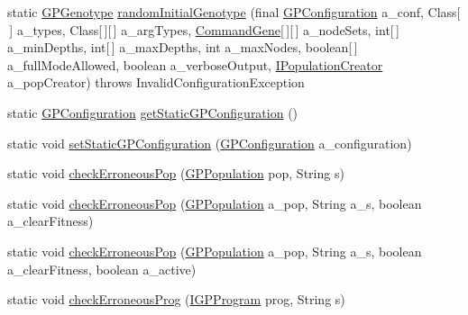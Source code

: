 \begin{DoxyCompactItemize}
static \hyperlink{classorg_1_1jgap_1_1gp_1_1impl_1_1_g_p_genotype}{G\-P\-Genotype} \hyperlink{classorg_1_1jgap_1_1gp_1_1impl_1_1_g_p_genotype_af3246cb6a802ae1cde833013c130f6e9}{random\-Initial\-Genotype} (final \hyperlink{classorg_1_1jgap_1_1gp_1_1impl_1_1_g_p_configuration}{G\-P\-Configuration} a\-\_\-conf, Class\mbox{[}$\,$\mbox{]} a\-\_\-types, Class\mbox{[}$\,$\mbox{]}\mbox{[}$\,$\mbox{]} a\-\_\-arg\-Types, \hyperlink{classorg_1_1jgap_1_1gp_1_1_command_gene}{Command\-Gene}\mbox{[}$\,$\mbox{]}\mbox{[}$\,$\mbox{]} a\-\_\-node\-Sets, int\mbox{[}$\,$\mbox{]} a\-\_\-min\-Depths, int\mbox{[}$\,$\mbox{]} a\-\_\-max\-Depths, int a\-\_\-max\-Nodes, boolean\mbox{[}$\,$\mbox{]} a\-\_\-full\-Mode\-Allowed, boolean a\-\_\-verbose\-Output, \hyperlink{interfaceorg_1_1jgap_1_1gp_1_1_i_population_creator}{I\-Population\-Creator} a\-\_\-pop\-Creator)  throws Invalid\-Configuration\-Exception 
\item 
static \hyperlink{classorg_1_1jgap_1_1gp_1_1impl_1_1_g_p_configuration}{G\-P\-Configuration} \hyperlink{classorg_1_1jgap_1_1gp_1_1impl_1_1_g_p_genotype_a07e4b22e1cd10bbc198278efd83d27ce}{get\-Static\-G\-P\-Configuration} ()
\item 
static void \hyperlink{classorg_1_1jgap_1_1gp_1_1impl_1_1_g_p_genotype_a7750ff9b7bd73efcfff522365f4650d7}{set\-Static\-G\-P\-Configuration} (\hyperlink{classorg_1_1jgap_1_1gp_1_1impl_1_1_g_p_configuration}{G\-P\-Configuration} a\-\_\-configuration)
\item 
static void \hyperlink{classorg_1_1jgap_1_1gp_1_1impl_1_1_g_p_genotype_a71cc6d10d81d132ee542767aca12f502}{check\-Erroneous\-Pop} (\hyperlink{classorg_1_1jgap_1_1gp_1_1impl_1_1_g_p_population}{G\-P\-Population} pop, String s)
\item 
static void \hyperlink{classorg_1_1jgap_1_1gp_1_1impl_1_1_g_p_genotype_af886a583789e547400134f2ad533cf8b}{check\-Erroneous\-Pop} (\hyperlink{classorg_1_1jgap_1_1gp_1_1impl_1_1_g_p_population}{G\-P\-Population} a\-\_\-pop, String a\-\_\-s, boolean a\-\_\-clear\-Fitness)
\item 
static void \hyperlink{classorg_1_1jgap_1_1gp_1_1impl_1_1_g_p_genotype_a6cab9ecf163e4eec850da3cc63df8665}{check\-Erroneous\-Pop} (\hyperlink{classorg_1_1jgap_1_1gp_1_1impl_1_1_g_p_population}{G\-P\-Population} a\-\_\-pop, String a\-\_\-s, boolean a\-\_\-clear\-Fitness, boolean a\-\_\-active)
\item 
static void \hyperlink{classorg_1_1jgap_1_1gp_1_1impl_1_1_g_p_genotype_a4104bc4b934e717c15e3a7b5e50a0748}{check\-Erroneous\-Prog} (\hyperlink{interfaceorg_1_1jgap_1_1gp_1_1_i_g_p_program}{I\-G\-P\-Program} prog, String s)

\end{DoxyCompactItemize}

